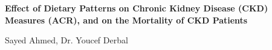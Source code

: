 \begin{center}
\textbf{Effect of Dietary Patterns on Chronic Kidney Disease (CKD) Measures (ACR), and on the Mortality of CKD Patients}

\medskip
Sayed Ahmed, Dr. Youcef Derbal
\end{center}
